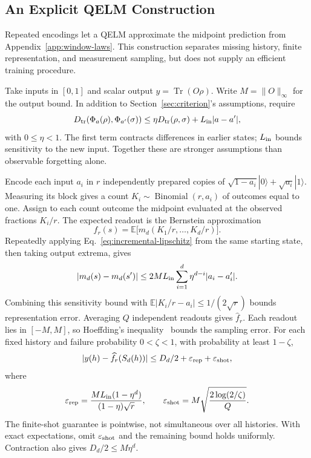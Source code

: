 \subsection{An Explicit QELM Construction}
\label{app:bernstein-resources}

Repeated encodings let a QELM approximate the midpoint prediction from
Appendix~\ref{app:window-laws}. This construction separates missing history,
finite representation, and measurement sampling, but does not supply an
efficient training procedure.

Take inputs in $[0,1]$ and scalar output $y=\operatorname{Tr}(O\rho)$.
Write $M=\|O\|_\infty$ for the output bound. In addition to
Section~\ref{sec:criterion}'s assumptions, require
\begin{equation}
 D_{\rm tr}(\Phi_a(\rho),\Phi_{a'}(\sigma))
 \leq\eta D_{\rm tr}(\rho,\sigma)+L_{\rm in}|a-a'|,
 \label{eq:incremental-lipschitz}
\end{equation}
with $0\leq\eta<1$. The first term contracts differences in earlier states;
$L_{\rm in}$ bounds sensitivity to the new input. Together these are
stronger assumptions than observable forgetting alone.

Encode each input $a_i$ in $r$ independently prepared copies of
$\sqrt{1-a_i}|0\rangle+\sqrt{a_i}|1\rangle$. Measuring its block gives
a count $K_i\sim\operatorname{Binomial}(r,a_i)$ of outcomes equal to one.
Assign to each count outcome the midpoint evaluated at the observed
fractions $K_i/r$. The expected readout is the Bernstein approximation
\[
 f_r(s)=\mathbb E\bigl[m_d(K_1/r,\ldots,K_d/r)\bigr].
\]
Repeatedly applying Eq.~\eqref{eq:incremental-lipschitz} from the same
starting state, then taking output extrema, gives
\[
 |m_d(s)-m_d(s')|
 \leq2ML_{\rm in}\sum_{i=1}^d\eta^{d-i}|a_i-a_i'|.
\]
Combining this sensitivity bound with
$\mathbb E|K_i/r-a_i|\leq1/(2\sqrt r)$ bounds representation error.
Averaging $Q$ independent readouts gives $\widehat f_r$.
Each readout lies in $[-M,M]$, so Hoeffding's
inequality~\cite{hoeffding1963probability} bounds the sampling error.
For each fixed history and failure probability $0<\zeta<1$, with
probability at least $1-\zeta$,
\begin{equation}
 |y(h)-\widehat f_r(S_d(h))|
 \leq D_d/2+\varepsilon_{\rm rep}+\varepsilon_{\rm shot},
 \label{eq:midpoint-resource-bound}
\end{equation}
where
\[
 \varepsilon_{\rm rep}=\frac{ML_{\rm in}(1-\eta^d)}{(1-\eta)\sqrt r},
 \qquad
 \varepsilon_{\rm shot}=M\sqrt{\frac{2\log(2/\zeta)}{Q}}.
\]
The finite-shot guarantee is pointwise, not simultaneous over all histories.
With exact expectations, omit $\varepsilon_{\rm shot}$ and the remaining
bound holds uniformly. Contraction also gives $D_d/2\leq M\eta^d$.

